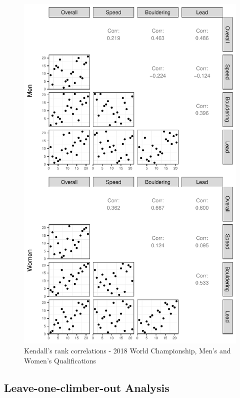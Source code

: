 \documentclass[12pt]{article}
\begin{document}
\begin{figure}

{\centering \includegraphics{draft_files/figure-latex/unnamed-chunk-17-1} 

}

\caption{Kendall's rank correlations - 2018 World Championship, Men's and Women's Qualifications}\label{fig:unnamed-chunk-17}
\end{figure}

\hypertarget{leave-one-climber-out-analysis}{%
\subsection{Leave-one-climber-out
Analysis}\label{leave-one-climber-out-analysis}}
\end{document}
